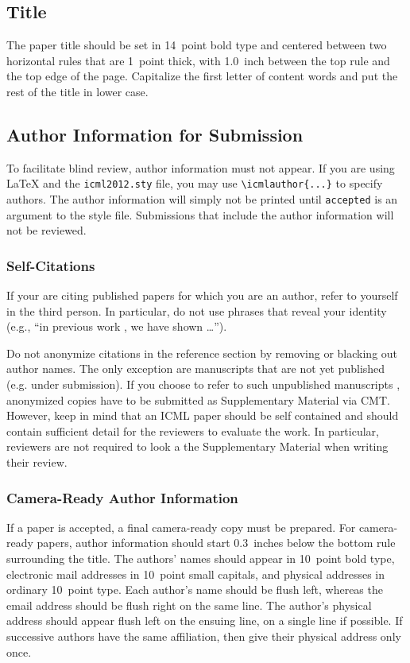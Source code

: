 \documentclass{article}
\begin{document}
\subsection{Title}

The paper title should be set in 14~point bold type and centered
between two horizontal rules that are 1~point thick, with 1.0~inch
between the top rule and the top edge of the page. Capitalize the
first letter of content words and put the rest of the title in lower
case.

\subsection{Author Information for Submission}
\label{author info}

To facilitate blind review, author information must not appear.  If
you are using \LaTeX\/ and the \texttt{icml2012.sty} file, you may use
\verb+\icmlauthor{...}+ to specify authors.  The author information
will simply not be printed until {\tt accepted} is an argument to the
style file. Submissions that include the author information will not
be reviewed.

\subsubsection{Self-Citations}

If your are citing published papers for which you are an author, refer
to yourself in the third person. In particular, do not use phrases
that reveal your identity (e.g., ``in previous work \cite{langley00}, we
have shown \ldots'').

Do not anonymize citations in the reference section by removing or
blacking out author names. The only exception are manuscripts that are
not yet published (e.g. under submission). If you choose to refer to
such unpublished manuscripts \cite{anonymous}, anonymized copies have to be submitted
as Supplementary Material via CMT. However, keep in mind that an ICML
paper should be self contained and should contain sufficient detail
for the reviewers to evaluate the work. In particular, reviewers are
not required to look a the Supplementary Material when writing their
review.

\subsubsection{Camera-Ready Author Information}
\label{final author}

If a paper is accepted, a final camera-ready copy must be prepared.
%
For camera-ready papers, author information should start 0.3~inches
below the bottom rule surrounding the title. The authors' names should
appear in 10~point bold type, electronic mail addresses in 10~point
small capitals, and physical addresses in ordinary 10~point type.
Each author's name should be flush left, whereas the email address
should be flush right on the same line. The author's physical address
should appear flush left on the ensuing line, on a single line if
possible. If successive authors have the same affiliation, then give
their physical address only once.
\end{document}
